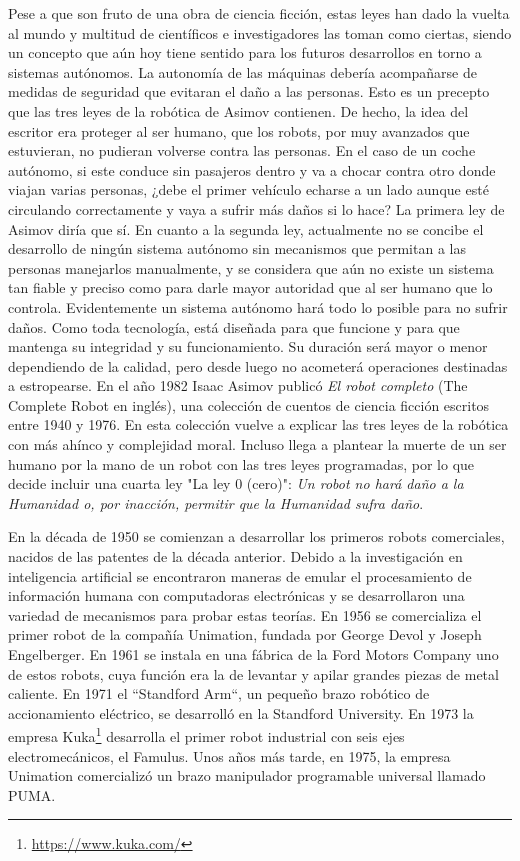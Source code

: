Pese a que son fruto de una obra de ciencia ficción, estas leyes han dado la vuelta al mundo y multitud de científicos e investigadores las toman como ciertas, siendo un concepto que aún hoy tiene sentido para los futuros desarrollos en torno a sistemas autónomos. La autonomía de las máquinas debería acompañarse de medidas de seguridad que evitaran el daño a las personas. Esto es un precepto que las tres leyes de la robótica de Asimov contienen. De hecho, la idea del escritor era proteger al ser humano, que los robots, por muy avanzados que estuvieran, no pudieran volverse contra las personas. En el caso de un coche autónomo, si este conduce sin pasajeros dentro y va a chocar contra otro donde viajan varias personas, ¿debe el primer vehículo echarse a un lado aunque esté circulando correctamente y vaya a sufrir más daños si lo hace? La primera ley de Asimov diría que sí. En cuanto a la segunda ley, actualmente no se concibe el desarrollo de ningún sistema autónomo sin mecanismos que permitan a las personas manejarlos manualmente, y se considera que aún no existe un sistema tan fiable y preciso como para darle mayor autoridad que al ser humano que lo controla. Evidentemente un sistema autónomo hará todo lo posible para no sufrir daños. Como toda tecnología, está diseñada para que funcione y para que mantenga su integridad y su funcionamiento. Su duración será mayor o menor dependiendo de la calidad, pero desde luego no acometerá operaciones destinadas a estropearse. En el año 1982 Isaac Asimov publicó \textit{El robot completo} (The Complete Robot en inglés), una colección de cuentos de ciencia ficción escritos entre 1940 y 1976. En esta colección vuelve a explicar las tres leyes de la robótica con más ahínco y complejidad moral. Incluso llega a plantear la muerte de un ser humano por la mano de un robot con las tres leyes programadas, por lo que decide incluir una cuarta ley "La ley 0 (cero)": \textit{Un robot no hará daño a la Humanidad o, por inacción, permitir que la Humanidad sufra daño}.

En la década de 1950 se comienzan a desarrollar los primeros robots comerciales, nacidos de las patentes de la década anterior. Debido a la investigación en inteligencia artificial se encontraron maneras de emular el procesamiento de información humana con computadoras electrónicas y se desarrollaron una variedad de mecanismos para probar estas teorías. En 1956 se comercializa el primer robot de la compañía Unimation, fundada por George Devol y Joseph Engelberger. En 1961 se instala en una fábrica de la Ford Motors Company uno de estos robots, cuya función era la de levantar y apilar grandes piezas de metal caliente. En 1971 el “Standford Arm“, un pequeño brazo robótico de accionamiento eléctrico, se desarrolló en la Standford University. En 1973 la empresa Kuka\footnote{\url{https://www.kuka.com/}} desarrolla el primer robot industrial con seis ejes electromecánicos, el Famulus. Unos años más tarde, en 1975, la empresa Unimation comercializó un brazo manipulador programable universal llamado PUMA.

